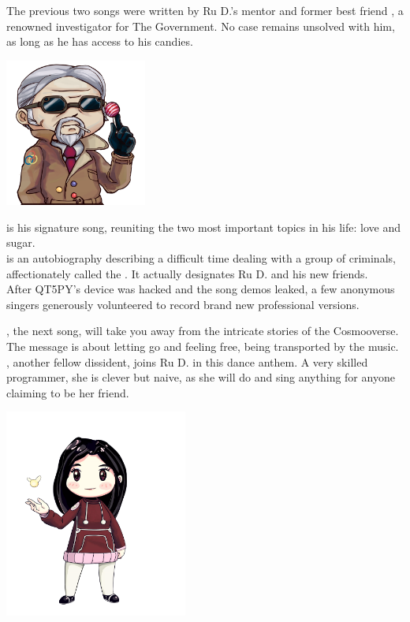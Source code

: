 
The previous two songs were written by Ru D.'s mentor and former best friend , a renowned investigator for The Government. No case remains unsolved with him, as long as he has access to his candies. 

\begin{center}
\includegraphics[width=0.35\textwidth]{Assets/qt5c_small}
\end{center}

 is his signature song, reuniting the two most important topics in his life: love and sugar.\\

 is an autobiography describing a difficult time dealing with a group of criminals, affectionately called the . It actually designates Ru D. and his new friends. \\

After QT5PY's device was hacked and the song demos leaked, a few anonymous singers generously volunteered to record brand new professional versions.

\clearpage

, the next song, will take you away from the intricate stories of the Cosmooverse. The message is about letting go and feeling free, being transported by the music.\\

, another fellow dissident, joins Ru D. in this dance anthem. A very skilled programmer, she is clever but naive, as she will do and sing anything for anyone claiming to be her friend. 

\begin{center}
\includegraphics[width=0.45\textwidth]{Assets/florrie}
\end{center}

\clearpage